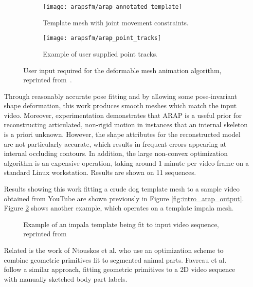     \begin{figure}[H]
        \centering
        \begin{subfigure}{0.5\textwidth}
        \centering
            \texttt{[image: arapsfm/arap\_annotated\_template]}
            \caption{Template mesh with joint movement constraints.}
        \end{subfigure}%
        \begin{subfigure}{0.5\textwidth}
        \centering
            \texttt{[image: arapsfm/arap\_point\_tracks]}
            \caption{Example of user supplied point tracks.}
        \end{subfigure}%
        \caption{User input required for the deformable mesh animation algorithm, reprinted from~\cite{arap_stebbing}.}
        \label{fig:arap_user}
    \end{figure} 

    Through reasonably accurate pose fitting and by allowing some pose-invariant shape deformation, this work produces smooth meshes which match the input video. Moreover, experimentation demonstrates that ARAP is a useful prior for reconstructing articulated, non-rigid motion in instances that an internal skeleton is a priori unknown. However, the shape attributes for the reconstructed model are not particularly accurate, which results in frequent errors appearing at internal occluding contours. In addition, the large non-convex optimization algorithm is an expensive operation, taking around 1 minute per video frame on a standard Linux workstation. Results are shown on 11 sequences.

    Results showing this work fitting a crude dog template mesh to a sample video obtained from YouTube are shown previously in Figure \ref{fig:intro_arap_output}. Figure \ref{fig:arap_output} shows another example, which operates on a template impala mesh.

    \begin{figure}[H]
        \caption{Example of an impala template being fit to input video sequence, reprinted from~\cite{arap_stebbing}}
        \label{fig:arap_output}
    \end{figure}

    Related is the work of Ntouskos et al. who use an optimization scheme to combine geometric primitives fit to segmented animal parts. Favreau et al.~ follow a similar approach, fitting geometric primitives to a 2D video sequence with manually sketched body part labels. 

